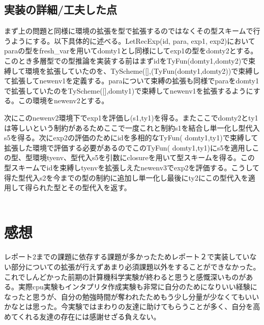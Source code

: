 \documentclass[a4paper,11pt,oneside,openany]{jsarticle}
\begin{document}
  \subsection{実装の詳細/工夫した点}
    まず上の問題と同様に環境の拡張を型で拡張するのではなくその型スキームで行うようにする。以下具体的に述べる。LetRecExp(id, para, exp1, exp2)においてparaの型をfresh\_varを用いてdomty1とし同様にしてexp1の型をdomty2とする。このとき多層型での型推論を実装する前はまずidをTyFun(domty1,domty2)で束縛して環境を拡張していたのを、TyScheme($\bigl[\bigr]$,(TyFun(domty1,domty2))で束縛して拡張してnewenv1を定義する。paraについて束縛の拡張も同様でparaをdomty1で拡張していたのをTyScheme($\bigl[\bigr]$,domty1)で束縛してnewenv1を拡張するようにする。この環境をnewenv2とする。\par
    次にこのnewenv2環境下でexp1を評価し(s1,ty1)を得る。またここでdomty2とty1は等しいという制約があるためここで一度これと制約s1を結合し単一化し型代入s5を得る。次にexp2の評価のためにidを多相的なTyFun( domty1,ty1)で束縛して拡張した環境で評価する必要があるのでこのTyFun( domty1,ty1)にs5を適用しこの型、型環境tyenv、型代入s5を引数にclosureを用いて型スキームを得る。この型スキームでidを束縛しtyenvを拡張しえたnewenv3でexp2を評価する。こうして得た型代入s2を今までの型の制約に追加し単一化し最後にty2にこの型代入を適用して得られた型とその型代入を返す。
\\\\

\section{感想}
  レポート2までの課題に依存する課題が多かったためレポート２で実装していない部分についての拡張が行えずあまり必須課題以外をすることができなかった。これでしんどかった前期の計算機科学実験が終わると思うと感慨深いものがある。実際cpu実験もインタプリタ作成実験も非常に自分のためになりいい経験になったと思うが、自分の勉強時間が奪われたためもう少し分量が少なくてもいいかなとは思った。今実験ではまわりの友達に助けてもらうことが多く、自分を高めてくれる友達の存在には感謝せざる負えない。
\end{document}
